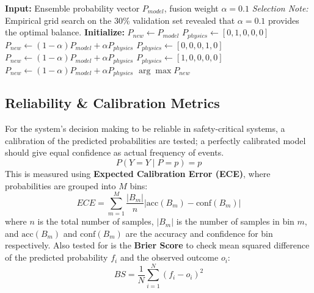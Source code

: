 \documentclass[pdflatex,sn-mathphys-num]{sn-jnl}
\theoremstyle{thmstyleone}
\theoremstyle{thmstyletwo}
\theoremstyle{thmstylethree}
\begin{document}
\begin{algorithm}[h]
\caption{Probabilistic Physics Fusion Layer}\label{alg:physics_layer}
\begin{algorithmic}[1]
\State \textbf{Input:} Ensemble probability vector $P_{model}$, fusion weight $\alpha = 0.1$
\State \textit{Selection Note:} Empirical grid search on the 30\% validation set revealed that $\alpha=0.1$ provides the optimal balance.
\State \textbf{Initialize:} $P_{new} \gets P_{model}$
    \State $P_{physics} \gets [0, 1, 0, 0, 0]$ 
    \State $P_{new} \gets (1 - \alpha) P_{model} + \alpha P_{physics}$
    \State $P_{physics} \gets [0, 0, 0, 1, 0]$ 
    \State $P_{new} \gets (1 - \alpha) P_{model} + \alpha P_{physics}$
    \State $P_{physics} \gets [1, 0, 0, 0, 0]$ 
    \State $P_{new} \gets (1 - \alpha) P_{model} + \alpha P_{physics}$
\EndIf
\State \Return $\arg\max P_{new}$
\end{algorithmic}
\end{algorithm}

\FloatBarrier
\subsection{Reliability \& Calibration Metrics}
For the system's decision making to be reliable in safety-critical systems, a calibration of the predicted probabilities are tested; a perfectly calibrated model should give equal confidence as actual frequency of events.
\begin{equation}
P(Y=Y \mid P=p) = p
\end{equation}
This is measured using \textbf{Expected Calibration Error (ECE)}, where probabilities are grouped into $M$ bins:
\begin{equation}
ECE = \sum_{m=1}^{M} \frac{|B_m|}{n} |\text{acc}(B_m) - \text{conf}(B_m)|
\end{equation}
where $n$ is the total number of samples, $|B_m|$ is the number of samples in bin $m$, and $\text{acc}(B_m)$ and $\text{conf}(B_m)$ are the accuracy and confidence for bin respectively. Also tested for is the \textbf{Brier Score} to check mean squared difference of the predicted probability $f_i$ and the observed outcome $o_i$:
\begin{equation}
BS = \frac{1}{N} \sum_{i=1}^{N} (f_i - o_i)^2
\end{equation}
\end{document}
